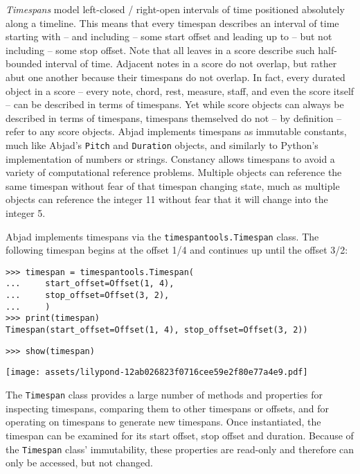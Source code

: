 \emph{Timespans} model left-closed / right-open intervals of time positioned
absolutely along a timeline. This means that every timespan describes an
interval of time starting with -- and including -- some start offset and
leading up to -- but not including -- some stop offset. Note that all leaves in
a score describe such half-bounded interval of time. Adjacent notes in a score
do not overlap, but rather abut one another because their timespans do not
overlap. In fact, every durated object in a score -- every note, chord, rest,
measure, staff, and even the score itself -- can be described in terms of
timespans. Yet while score objects can always be described in terms of
timespans, timespans themselved do not -- by definition -- refer to any score
objects. Abjad implements timespans as immutable constants, much like Abjad's
\texttt{Pitch} and \texttt{Duration} objects, and similarly to Python's
implementation of numbers or strings. Constancy allows timespans to avoid a
variety of computational reference problems. Multiple objects can reference the
same timespan without fear of that timespan changing state, much as multiple
objects can reference the integer 11 without fear that it will change into the
integer 5.

Abjad implements timespans via the \texttt{timespantools.Timespan} class. The
following timespan begins at the offset 1/4 and continues up until the offset
3/2:

\begin{comment}
<abjad>
timespan = timespantools.Timespan(
    start_offset=Offset(1, 4),
    stop_offset=Offset(3, 2),
    )
print(timespan)
show(timespan)
</abjad>
\end{comment}

\begin{singlespacing}
\vspace{-0.5\baselineskip}
\begin{lstlisting}
>>> timespan = timespantools.Timespan(
...     start_offset=Offset(1, 4),
...     stop_offset=Offset(3, 2),
...     )
>>> print(timespan)
Timespan(start_offset=Offset(1, 4), stop_offset=Offset(3, 2))
\end{lstlisting}
\begin{lstlisting}
>>> show(timespan)
\end{lstlisting}
\noindent\texttt{[image: assets/lilypond-12ab026823f0716cee59e2f80e77a4e9.pdf]}
\end{singlespacing}

\noindent The \texttt{Timespan} class provides a large number of methods and
properties for inspecting timespans, comparing them to other timespans or
offsets, and for operating on timespans to generate new timespans. Once
instantiated, the timespan can be examined for its start offset, stop offset
and duration. Because of the \texttt{Timespan} class' immutability, these
properties are read-only and therefore can only be accessed, but not changed.

